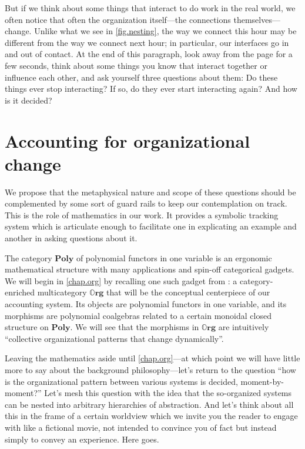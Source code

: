 \documentclass[11pt, one side, article]{memoir}
\theoremstyle{definition}
\theoremstyle{plain}
\newcommand{\Cat}[1]{\mathbf{#1}}%
\newcommand{\poly}{\Cat{Poly}}
\newcommand{\0}{\textsf{0}}
\newcommand{\1}{\tn{\textsf{1}}}
\newcommand{\org}{{\mathbb{O}\Cat{rg}}}
\begin{document}
But if we think about some things that interact to do work in the real world, we often notice that often the organization itself---the connections themselves---change. Unlike what we see in \cref{fig.nesting}, the way we connect this hour may be different from the way we connect next hour; in particular, our interfaces go in and out of contact. At the end of this paragraph, look away from the page for a few seconds, think about some things you know that interact together or influence each other, and ask yourself three questions about them: Do these things ever stop interacting? If so, do they ever start interacting again? And how is it decided? 

\section{Accounting for organizational change}

We propose that the metaphysical nature and scope of these questions should be complemented by some sort of guard rails to keep our contemplation on track. This is the role of mathematics in our work. It provides a symbolic tracking system which is articulate enough to facilitate one in explicating an example and another in asking questions about it.

The category $\poly$ of polynomial functors in one variable is an ergonomic mathematical structure with many applications and spin-off categorical gadgets. We will begin in \cref{chap.org} by recalling one such gadget from \cite{spivak2021learners}: a category-enriched multicategory $\org$ that will be the conceptual centerpiece of our accounting system. Its objects are polynomial functors in one variable, and its morphisms are polynomial coalgebras related to a certain monoidal closed structure on $\poly$. We will see that the morphisms in $\org$ are intuitively ``collective organizational patterns that change dynamically''.

Leaving the mathematics aside until \cref{chap.org}---at which point we will have little more to say about the background philosophy---let's return to the question ``how is the organizational pattern between various systems is decided, moment-by-moment?'' Let's mesh this question with the idea that the so-organized systems can be nested into arbitrary hierarchies of abstraction. And let's think about all this in the frame of a certain worldview which we invite you the reader to engage with like a fictional movie, not intended to convince you of fact but instead simply to convey an experience. Here goes.
\end{document}
